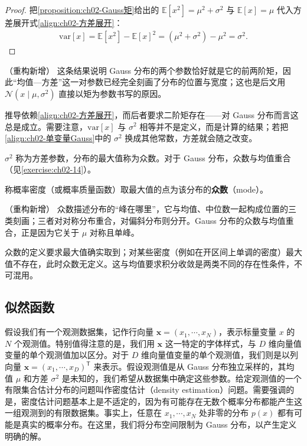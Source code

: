 \documentclass[../../main.tex]{subfiles}
\begin{document}
\begin{proof}
把\cref{proposition:ch02-Gauss矩}给出的 $\mathbb{E}[x^{2}]=\mu^{2}+\sigma^{2}$ 与 $\mathbb{E}[x]=\mu$ 代入方差展开式\eqref{align:ch02-方差展开}：
\begin{align*}
  \mathrm{var}[x] = \mathbb{E}[x^{2}] - \mathbb{E}[x]^{2} = (\mu^{2}+\sigma^{2}) - \mu^{2} = \sigma^{2} .
\end{align*}
\end{proof}

\begin{remark}（重构新增）
这条结果说明 Gauss 分布的两个参数恰好就是它的前两阶矩，因此“均值—方差”这一对参数已经完全刻画了分布的位置与宽度；这也是后文用 $\mathcal{N}(x\mid\mu,\sigma^{2})$ 直接以矩为参数书写的原因。

推导依赖\eqref{align:ch02-方差展开}，而后者要求二阶矩存在——对 Gauss 分布而言这总是成立。需要注意，$\mathrm{var}[x]$ 与 $\sigma^{2}$ 相等并不是定义，而是计算的结果；若把\eqref{align:ch02-单变量Gauss}中的 $\sigma^{2}$ 换成其他常数，方差就会随之改变。
\end{remark}

$\sigma^{2}$ 称为方差参数，分布的最大值称为众数。对于 Gauss 分布，众数与均值重合（见\cref{exercise:ch02-14}）。

\begin{definition}[众数]\label{definition:ch02-众数}
称概率密度（或概率质量函数）取最大值的点为该分布的\textbf{众数}（mode）。
\end{definition}

\begin{remark}（重构新增）
众数描述分布的“峰在哪里”，它与均值、中位数一起构成位置的三类刻画；三者对对称分布重合，对偏斜分布则分开。Gauss 分布的众数与均值重合，正是因为它关于 $\mu$ 对称且单峰。

众数的定义要求最大值确实取到；对某些密度（例如在开区间上单调的密度）最大值不存在，此时众数无定义。这与均值要求积分收敛是两类不同的存在性条件，不可混用。
\end{remark}

\subsection{似然函数}\label{subsection:ch02-似然函数}

假设我们有一个观测数据集，记作行向量 $\mathbf{x}=(x_1,\cdots,x_N)$，表示标量变量 $x$ 的 $N$ 个观测值。特别值得注意的是，我们用 $\mathbf{x}$ 这一特定的字体样式，与 $D$ 维向量值变量的单个观测值加以区分。对于 $D$ 维向量值变量的单个观测值，我们则是以列向量 $\mathbf{x}=(x_1,\cdots,x_D)^{\mathsf{T}}$ 来表示。假设观测值是从 Gauss 分布独立采样的，其均值 $\mu$ 和方差 $\sigma^{2}$ 是未知的，我们希望从数据集中确定这些参数。给定观测值的一个有限集合估计分布的问题叫作密度估计（density estimation）问题。需要强调的是，密度估计问题基本上是不适定的，因为有可能存在无数个概率分布都能产生这一组观测到的有限数据集。事实上，任意在 $x_1,\cdots,x_N$ 处非零的分布 $p(x)$ 都有可能是真实的概率分布。在这里，我们将分布空间限制为 Gauss 分布，以产生定义明确的解。
\end{document}
